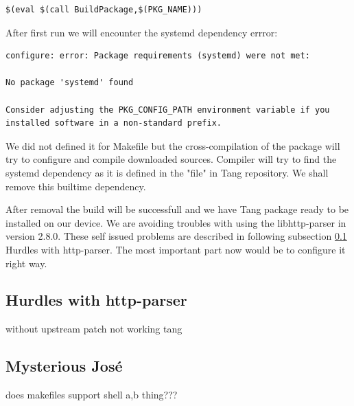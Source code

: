 \begin{lstlisting}[columns=fixed,basicstyle=\ttfamily\footnotesize,tabsize=4,backgroundcolor=\color{yellow!10}]
$(eval $(call BuildPackage,$(PKG_NAME)))
\end{lstlisting}

After first run we will encounter the systemd dependency errror:
\begin{lstlisting}[columns=fixed,basicstyle=\ttfamily\footnotesize,tabsize=4,backgroundcolor=\color{yellow!10}]
configure: error: Package requirements (systemd) were not met:

No package 'systemd' found

Consider adjusting the PKG_CONFIG_PATH environment variable if you
installed software in a non-standard prefix.
\end{lstlisting}
We did not defined it for Makefile but the cross-compilation of the package will try to configure and compile downloaded sources.
Compiler will try to find the systemd dependency as it is defined in the "file" in Tang repository.
We shall remove this builtime dependency.


After removal the build will be successfull and we have Tang package ready to be installed on our device.
We are avoiding troubles with using the libhttp-parser in version 2.8.0.
These self issued problems are described in following subsection \ref{http_parser_problems} Hurdles with http-parser.
The most important part now would be to configure it right way.



\subsection{Hurdles with http-parser}\label{http_parser_problems}

without upstream patch not working tang 
\newpage



\subsection{Mysterious José}

does makefiles support shell {a,b} thing???
\newpage
